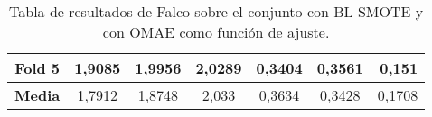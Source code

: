 \begin{table}[H]
{\begin{tabular}{|crrrrrr|}
\multicolumn{1}{|c|}{\textbf{Fold 5}} & \multicolumn{1}{c|}{1,9085}            & \multicolumn{1}{c|}{1,9956}              & \multicolumn{1}{c|}{2,0289}          & \multicolumn{1}{c|}{0,3404}            & \multicolumn{1}{c|}{0,3561}              & 0,151                              \\ \hline
\multicolumn{1}{|c|}{\textbf{Media}}  & \multicolumn{1}{c|}{1,7912}           & \multicolumn{1}{c|}{1,8748}             & \multicolumn{1}{c|}{2,033}           & \multicolumn{1}{c|}{0,3634}           & \multicolumn{1}{c|}{0,3428}              & 0,1708                            \\ \hline
\end{tabular}%
}
\caption{Tabla de resultados de Falco sobre el conjunto con BL-SMOTE y con OMAE como función de ajuste.}\label{tablaFALCOconBLSMOTEconOMAE}

\end{table}

